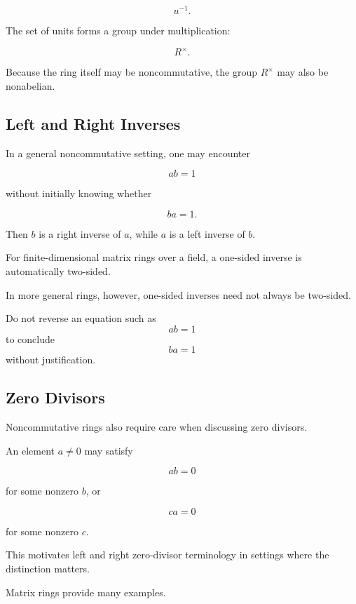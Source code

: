 \[ u^{-1}. \]

The set of units forms a group under multiplication:

\[ R^\times. \]

Because the ring itself may be noncommutative, the group \(R^\times\) may
also be nonabelian.

\subsection{Left and Right Inverses}
\label{subsec:left-right-inverses}

In a general noncommutative setting, one may encounter

\[ ab=1 \]

without initially knowing whether

\[ ba=1. \]

Then \(b\) is a right inverse of \(a\), while \(a\) is a left inverse of
\(b\).

For finite-dimensional matrix rings over a field, a one-sided inverse is
automatically two-sided.

In more general rings, however, one-sided inverses need not always be
two-sided.

\begin{warningbox}
Do not reverse an equation such as
\[ ab=1 \]
to conclude
\[ ba=1 \]
without justification.
\end{warningbox}

\subsection{Zero Divisors}
\label{subsec:noncommutative-zero-divisors}

Noncommutative rings also require care when discussing zero divisors.

An element \(a\neq0\) may satisfy

\[ ab=0 \]

for some nonzero \(b\), or

\[ ca=0 \]

for some nonzero \(c\).

This motivates left and right zero-divisor terminology in settings where the
distinction matters.

Matrix rings provide many examples.

